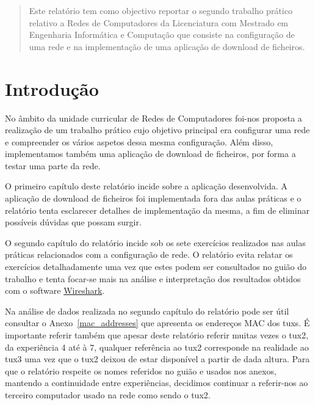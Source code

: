\documentclass[11pt,a4paper,reqno]{report}
\numberwithin{equation}{section}
\begin{document}



\begin{abstract}
	
Este relatório tem como objectivo reportar o segundo trabalho prático relativo a Redes de Computadores da Licenciatura com Mestrado em Engenharia Informática e Computação que consiste na configuração de uma rede e na implementação de uma aplicação de download de ficheiros.

\end{abstract}


\tableofcontents


\chapter{Introdução}

No âmbito da unidade curricular de Redes de Computadores foi-nos proposta a realização de um trabalho prático cujo objetivo principal era configurar uma rede e compreender os vários aspetos dessa mesma configuração. Além disso, implementamos também uma aplicação de download de ficheiros, por forma a testar uma parte da rede.

O primeiro capítulo deste relatório incide sobre a aplicação desenvolvida. A aplicação de download de ficheiros foi implementada fora das aulas práticas e o relatório tenta esclarecer detalhes de implementação da mesma, a fim de eliminar possíveis dúvidas que possam surgir.

O segundo capítulo do relatório incide sob os sete exercícios realizados nas aulas práticas relacionados com a configuração de rede. O relatório evita relatar os exercícios detalhadamente uma vez que estes podem ser consultados no guião do trabalho e tenta focar-se mais na análise e interpretação dos resultados obtidos com o software \href{https://www.wireshark.org/}{Wireshark}.

Na análise de dados realizada no segundo capítulo do relatório pode ser útil consultar o Anexo~\ref{mac_addresses} que apresenta os endereços MAC dos tuxs. É importante referir também que apesar deste relatório referir muitas vezes o tux2, da experiência 4 até à 7, qualquer referência ao tux2 corresponde na realidade ao tux3 uma vez que o tux2 deixou de estar disponível a partir de dada altura. Para que o relatório respeite os nomes referidos no guião e usados nos anexos, mantendo a continuidade entre experiências, decidimos continuar a referir-nos ao terceiro computador usado na rede como sendo o tux2.  
	
\end{document}
